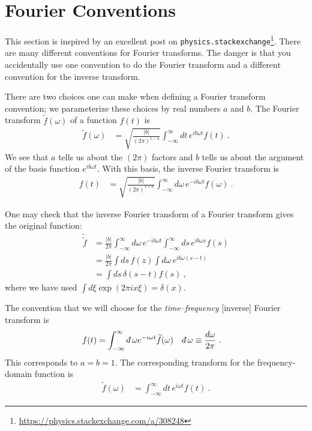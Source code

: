
\section{Fourier Conventions}
\label{app:Fourier}

This section is inspired by an excellent post on \texttt{physics.stackexchange}\footnote{\url{https://physics.stackexchange.com/a/308248}}. There are many different conventions for Fourier transforms. The danger is that you accidentally use one convention to do the Fourier transform and a different convention for the inverse transform. 

There are two choices one can make when defining a Fourier transform convention; we parameterize these choices by real numbers $a$ and $b$. The Fourier transform $\tilde f(\omega)$ of a function $f(t)$ is
\begin{align}
	\tilde f(\omega)
	&= 
	\sqrt{\frac{|b|}{(2\pi)^{1-a}}}
	\int_{-\infty}^\infty dt\, e^{ib\omega t} f(t) \ .
\end{align}
We see that $a$ tells us about the $(2\pi)$ factors and $b$ tells us about the argument of the basis function $e^{ib\omega t}$. With this basis, the inverse Fourier transform is 
\begin{align}
	f(t)&=
	\sqrt{\frac{|b|}{(2\pi)^{1+a}}}
	\int_{-\infty}^\infty d\omega\, e^{-ib\omega t} f(\omega) \ .
\end{align}

One may check that the inverse Fourier transform of a Fourier transform gives the original function:
\begin{align}
	\tilde{\tilde f} &=
	\frac{|b|}{2\pi}
	\int_{-\infty}^\infty d\omega\, e^{-ib\omega t}
	\int_{-\infty}^{\infty}
	ds\, e^{ib\omega s} f(s)
	\\
	&= 
	\frac{|b|}{2\pi}
	\int ds\, f(z) \int d\omega \, e^{ib\omega(s-t)}
	\\
	&= \int ds\, \delta(s-t) f(s) \ ,
\end{align}
where we have used $\int d\xi \exp(2\pi i x\xi) = \delta(x)$. 

The convention that we will choose for the \emph{time}--\emph{frequency} [inverse] Fourier transform is
\begin{align}
	f(t) &= \int_{-\infty}^{\infty} \dbar\omega e^{-i\omega t} \tilde f(\omega)
	&
	\dbar \omega &\equiv\frac{d\omega}{2\pi} \ .
\end{align}
This corresponds to $a=b=1$. The corresponding transform for the frequency-domain function is
\begin{align}
	\tilde f(\omega) &= 
	\int_{-\infty}^\infty d t\, e^{i\omega t} f(t) \ .
\end{align}


